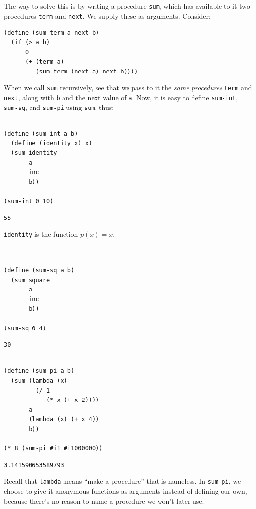 \documentclass[9pt]{report}
\begin{document}
The way to solve this is by writing a procedure \texttt{sum}, which has
available to it two procedures \texttt{term} and \texttt{next}. We supply these
as arguments. Consider:

\begin{verbatim}
(define (sum term a next b)
  (if (> a b)
      0
      (+ (term a)
         (sum term (next a) next b))))
\end{verbatim}

When we call \texttt{sum} recursively, see that we pass to it the \emph{same
procedures} \texttt{term} and \texttt{next}, along with \texttt{b} and the next value of
\texttt{a}. Now, it is easy to define \texttt{sum-int}, \texttt{sum-sq}, and \texttt{sum-pi}
using \texttt{sum}, thus:

\begin{verbatim}

(define (sum-int a b)
  (define (identity x) x)
  (sum identity
       a
       inc
       b))

(sum-int 0 10)
\end{verbatim}

\begin{verbatim}
55
\end{verbatim}


\texttt{identity} is the function \(p(x) = x\).

\begin{verbatim}


(define (sum-sq a b)
  (sum square
       a
       inc
       b))

(sum-sq 0 4)
\end{verbatim}

\begin{verbatim}
30
\end{verbatim}


\begin{verbatim}

(define (sum-pi a b)
  (sum (lambda (x)
         (/ 1
            (* x (+ x 2))))
       a
       (lambda (x) (+ x 4))
       b))

(* 8 (sum-pi #i1 #i1000000))
\end{verbatim}

\begin{verbatim}
3.141590653589793
\end{verbatim}


Recall that \texttt{lambda} means ``make a procedure'' that is nameless. In
\texttt{sum-pi}, we choose to give it anonymous functions as arguments
instead of defining our own, because there's no reason to name a
procedure we won't later use.
\end{document}
